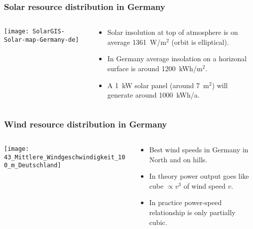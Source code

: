 \documentclass[10pt,aspectratio=169,dvipsnames]{beamer}
\let\olditem\item
\renewcommand{\item}{%
\olditem\vspace{5pt}}
\begin{document}
\begin{frame}
  \frametitle{Solar resource distribution in Germany}


    \begin{columns}[T]
\begin{column}{5.5cm}
  \texttt{[image: SolarGIS-Solar-map-Germany-de]}
\end{column}
\begin{column}{4.5cm}

  \begin{itemize}
    \item Solar insolution at top of atmosphere is on average 1361~W/m${}^2$
  (orbit is elliptical).
    \item In Germany average insolation on a horizonal surface is
      around 1200~kWh/m${}^2$.
    \item A 1~kW solar panel (around 7~m${}^2$) will generate around 1000~kWh/a.
  \end{itemize}
\end{column}
\end{columns}


\end{frame}





\begin{frame}
  \frametitle{Wind resource distribution in Germany}


    \begin{columns}[T]
\begin{column}{8.5cm}
  \texttt{[image: 43\_Mittlere\_Windgeschwindigkeit\_100\_m\_Deutschland]}
\end{column}
\begin{column}{3.5cm}

  \begin{itemize}
  \item Best wind speeds in Germany in North and on hills.
    \item In theory power output goes like cube $\propto v^3$ of wind
      speed $v$.
    \item In practice power-speed relationship is only partially
      cubic.
  \end{itemize}
\end{column}
\end{columns}


\end{frame}
\end{document}
